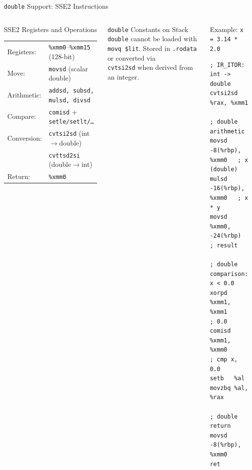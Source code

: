 \documentclass[aspectratio=169,11pt]{beamer}
\newcommand{\reg}[1]{\texttt{\%#1}}
\begin{document}
\begin{frame}[fragile]{\texttt{double} Support: SSE2 Instructions}
\begin{columns}[t]
  \begin{block}{SSE2 Registers and Operations}
    \small
    \begin{tabular}{ll}
      Registers:   & \reg{xmm0}--\reg{xmm15} (128-bit)\\
      Move:        & \texttt{movsd} (scalar double)\\
      Arithmetic:  & \texttt{addsd, subsd, mulsd, divsd}\\
      Compare:     & \texttt{comisd} + \texttt{setle/setlt/\ldots}\\
      Conversion:  & \texttt{cvtsi2sd} (int$\to$double)\\
                   & \texttt{cvttsd2si} (double$\to$int)\\
      Return:      & \reg{xmm0}\\
    \end{tabular}
  \end{block}
  \begin{alertblock}{\small \texttt{double} Constants on Stack}
    \small \texttt{double} cannot be loaded with \texttt{movq \$lit}.
    Stored in \texttt{.rodata} or converted via\\
    \texttt{cvtsi2sd} when derived from an integer.
  \end{alertblock}

  \begin{exampleblock}{Example: \texttt{x = 3.14 * 2.0}}
\begin{lstlisting}[style=asmslide]
; IR_ITOR: int -> double
cvtsi2sd  %rax, %xmm1

; double arithmetic
movsd  -8(%rbp),  %xmm0   ; x (double)
mulsd  -16(%rbp), %xmm0   ; x * y
movsd  %xmm0, -24(%rbp)   ; result

; double comparison: x < 0.0
xorpd  %xmm1, %xmm1       ; 0.0
comisd %xmm1, %xmm0       ; cmp x, 0.0
setb   %al
movzbq %al, %rax

; double return
movsd -8(%rbp), %xmm0
ret
\end{lstlisting}
  \end{exampleblock}
\end{columns}
\end{frame}

\end{document}

